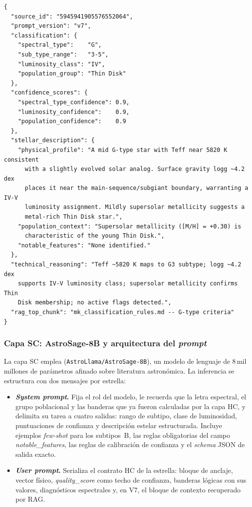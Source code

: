 \begin{lstlisting}[style=json,caption={Respuesta de AstroSage-8B (V7) para
  \emph{mu~Ara}. La clasificacion G\,IV coincide con el tipo de referencia
  G3\,IV--V de PASTEL.},
  label=lst:sc-output,float=ht]
{
  "source_id": "5945941905576552064",
  "prompt_version": "v7",
  "classification": {
    "spectral_type":    "G",
    "sub_type_range":   "3-5",
    "luminosity_class": "IV",
    "population_group": "Thin Disk"
  },
  "confidence_scores": {
    "spectral_type_confidence": 0.9,
    "luminosity_confidence":    0.9,
    "population_confidence":    0.9
  },
  "stellar_description": {
    "physical_profile": "A mid G-type star with Teff near 5820 K consistent
      with a slightly evolved solar analog. Surface gravity logg ~4.2 dex
      places it near the main-sequence/subgiant boundary, warranting a IV-V
      luminosity assignment. Mildly supersolar metallicity suggests a
      metal-rich Thin Disk star.",
    "population_context": "Supersolar metallicity ([M/H] = +0.30) is
      characteristic of the young Thin Disk.",
    "notable_features": "None identified."
  },
  "technical_reasoning": "Teff ~5820 K maps to G3 subtype; logg ~4.2 dex
    supports IV-V luminosity class; supersolar metallicity confirms Thin
    Disk membership; no active flags detected.",
  "rag_top_chunk": "mk_classification_rules.md -- G-type criteria"
}
\end{lstlisting}

\subsubsection{Capa SC: AstroSage-8B y arquitectura del \emph{prompt}}
\label{sec:sc-arquitectura}

La capa SC emplea \AstroSage{} \citep{astrosage} (\texttt{AstroLlama/AstroSage-8B}),
un modelo de lenguaje de \num{8}\,mil millones de parámetros afinado sobre literatura
astronómica. La inferencia se estructura con dos mensajes por estrella:

\begin{itemize}
  \item \textbf{\emph{System prompt}.} Fija el rol del modelo, le recuerda que la
  letra espectral, el grupo poblacional y las banderas que ya fueron calculadas
  por la capa HC, y delimita su tarea a cuatro salidas: rango de subtipo, clase de
  luminosidad, puntuaciones de confianza y descripción estelar estructurada.
  Incluye ejemplos \emph{few-shot} para los subtipos~B, las reglas obligatorias del
  campo \emph{notable\_features}, las reglas de calibración de confianza y el
  \emph{schema} JSON de salida exacto.
  \item \textbf{\emph{User prompt}.} Serializa el contrato HC de la estrella:
  bloque de anclaje, vector físico, \emph{quality\_score} como techo de confianza,
  banderas lógicas con sus valores, diagnósticos espectrales y, en V7, el bloque de
  contexto recuperado por RAG.
\end{itemize}

